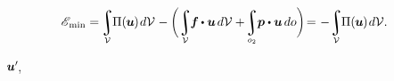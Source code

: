 \nopagebreak\vspace{-0.33em}
\begin{equation*}
\potentialenergyfunctional_{\hspace{-0.1ex}\text{min}}
= \hspace{-0.2ex}
\scalebox{.9}{$
   \displaystyle\integral\displaylimits_{\mathcal{V}}$} \hspace{-0.2ex}
   \potentialenergydensity ( \hspace{-0.1ex}\bm{u}\hspace{-0.1ex} ) \hspace{.2ex} d\mathcal{V} \hspace{.1ex}
   - \scalebox{.88}[1]{$ \biggl( $} \hspace{.1ex}
   \scalebox{.9}{$ \displaystyle \integral \displaylimits_{\mathcal{V}} $} \hspace{-0.2ex}
   \bm{f} \hspace{-0.1ex} \dotp \bm{u} \hspace{.3ex} d\mathcal{V}
   + \hspace{-0.3ex}
   \scalebox{.9}{$ \displaystyle \integral \displaylimits_{o_2} $} \hspace{-0.1ex}
   \bm{p} \dotp \bm{u} \hspace{.33ex}
   do
   \scalebox{.88}[1]{$ \biggr) $} \hspace{-0.3ex}
   = \hspace{.1ex} - \hspace{.1ex}
   \scalebox{.9}{$ \displaystyle \integral \displaylimits_{\mathcal{V}} $} \hspace{-0.2ex}
   \potentialenergydensity (\hspace{-0.1ex} \bm{u} \hspace{-0.1ex}) \hspace{.2ex}
   d\mathcal{V}
   .
\vspace{-0.1em}
\end{equation*}

~${\bm{u}'\hspace{-0.25ex}}$,

